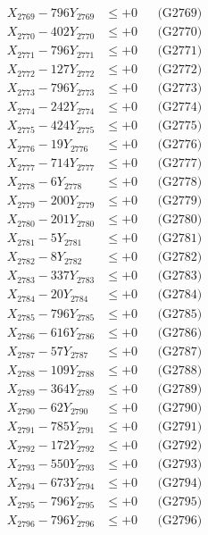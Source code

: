 \documentclass[a4paper,10pt]{article}
\begin{document}
{\begin{align}
X_{2769} - 796Y_{2769} &\leq +0 && \text{(G2769)} \\
X_{2770} - 402Y_{2770} &\leq +0 && \text{(G2770)} \\
\allowbreak
X_{2771} - 796Y_{2771} &\leq +0 && \text{(G2771)} \\
X_{2772} - 127Y_{2772} &\leq +0 && \text{(G2772)} \\
X_{2773} - 796Y_{2773} &\leq +0 && \text{(G2773)} \\
X_{2774} - 242Y_{2774} &\leq +0 && \text{(G2774)} \\
X_{2775} - 424Y_{2775} &\leq +0 && \text{(G2775)} \\
X_{2776} - 19Y_{2776} &\leq +0 && \text{(G2776)} \\
X_{2777} - 714Y_{2777} &\leq +0 && \text{(G2777)} \\
X_{2778} - 6Y_{2778} &\leq +0 && \text{(G2778)} \\
X_{2779} - 200Y_{2779} &\leq +0 && \text{(G2779)} \\
X_{2780} - 201Y_{2780} &\leq +0 && \text{(G2780)} \\
\allowbreak
X_{2781} - 5Y_{2781} &\leq +0 && \text{(G2781)} \\
X_{2782} - 8Y_{2782} &\leq +0 && \text{(G2782)} \\
X_{2783} - 337Y_{2783} &\leq +0 && \text{(G2783)} \\
X_{2784} - 20Y_{2784} &\leq +0 && \text{(G2784)} \\
X_{2785} - 796Y_{2785} &\leq +0 && \text{(G2785)} \\
X_{2786} - 616Y_{2786} &\leq +0 && \text{(G2786)} \\
X_{2787} - 57Y_{2787} &\leq +0 && \text{(G2787)} \\
X_{2788} - 109Y_{2788} &\leq +0 && \text{(G2788)} \\
X_{2789} - 364Y_{2789} &\leq +0 && \text{(G2789)} \\
X_{2790} - 62Y_{2790} &\leq +0 && \text{(G2790)} \\
\allowbreak
X_{2791} - 785Y_{2791} &\leq +0 && \text{(G2791)} \\
X_{2792} - 172Y_{2792} &\leq +0 && \text{(G2792)} \\
X_{2793} - 550Y_{2793} &\leq +0 && \text{(G2793)} \\
X_{2794} - 673Y_{2794} &\leq +0 && \text{(G2794)} \\
X_{2795} - 796Y_{2795} &\leq +0 && \text{(G2795)} \\
X_{2796} - 796Y_{2796} &\leq +0 && \text{(G2796)} \\

\end{align}}
\end{document}
